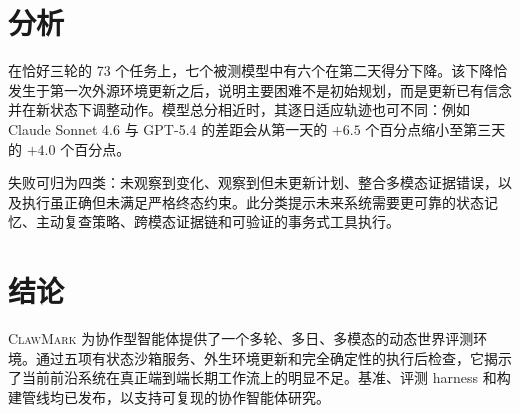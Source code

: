 \documentclass[10pt,twocolumn]{article}
\newcommand{\bench}{\textsc{ClawMark}\xspace}
\begin{document}
\section{分析}
在恰好三轮的 73 个任务上，七个被测模型中有六个在第二天得分下降。该下降恰发生于第一次外源环境更新之后，说明主要困难不是初始规划，而是更新已有信念并在新状态下调整动作。模型总分相近时，其逐日适应轨迹也可不同：例如 Claude Sonnet 4.6 与 GPT-5.4 的差距会从第一天的 $+6.5$ 个百分点缩小至第三天的 $+4.0$ 个百分点。

失败可归为四类：未观察到变化、观察到但未更新计划、整合多模态证据错误，以及执行虽正确但未满足严格终态约束。此分类提示未来系统需要更可靠的状态记忆、主动复查策略、跨模态证据链和可验证的事务式工具执行。

\section{结论}
\bench 为协作型智能体提供了一个多轮、多日、多模态的动态世界评测环境。通过五项有状态沙箱服务、外生环境更新和完全确定性的执行后检查，它揭示了当前前沿系统在真正端到端长期工作流上的明显不足。基准、评测 harness 和构建管线均已发布，以支持可复现的协作智能体研究。
\end{document}
